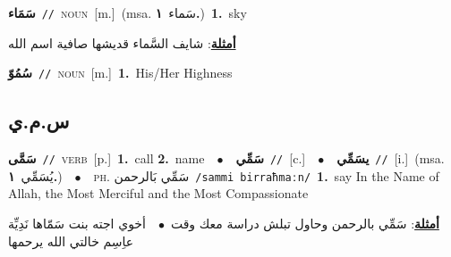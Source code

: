 \documentclass[10pt,a4paper,twoside]{article} %
\begin{document}
\begin{multicols}{2}
{\setlength\topsep{0pt}\textbf{\foreignlanguage{arabic}{سَمَاء}}\ {\color{gray}\texttt{//}\color{black}}\ \textsc{noun}\ [m.]\ \color{gray}(msa. \foreignlanguage{arabic}{سَماء}~\foreignlanguage{arabic}{\textbf{١.}})\color{black}\ \textbf{1.}~sky\  \begin{flushright}\color{gray}\foreignlanguage{arabic}{\textbf{\underline{\foreignlanguage{arabic}{أمثلة}}}: شايف السَّماء قديشها صافية اسم الله}\end{flushright}\color{black}} \vspace{2mm}

{\setlength\topsep{0pt}\textbf{\foreignlanguage{arabic}{سُمُوّ}}\ {\color{gray}\texttt{//}\color{black}}\ \textsc{noun}\ [m.]\ \textbf{1.}~His/Her Highness\ } \vspace{2mm}

\vspace{-3mm}
\subsection*{\color{blue}\foreignlanguage{arabic}{س.م.ي}\color{blue}{}} 

{\setlength\topsep{0pt}\textbf{\foreignlanguage{arabic}{سَمَّى}}\ {\color{gray}\texttt{//}\color{black}}\ \textsc{verb}\ [p.]\ \textbf{1.}~call  \textbf{2.}~name\ \ $\bullet$\ \ \setlength\topsep{0pt}\textbf{\foreignlanguage{arabic}{سَمِّي}}\ {\color{gray}\texttt{//}\color{black}}\ [c.]\ \ $\bullet$\ \ \setlength\topsep{0pt}\textbf{\foreignlanguage{arabic}{يسَمِّي}}\ {\color{gray}\texttt{//}\color{black}}\ [i.]\ \color{gray}(msa. \foreignlanguage{arabic}{يُسَمِّي}~\foreignlanguage{arabic}{\textbf{١.}})\color{black}\ \ $\bullet$\ \ \textsc{ph.} \color{gray} \foreignlanguage{arabic}{سَمِّي بَالرحمن}\color{black}\ {\color{gray}\texttt{/{\sffamily sammi birraħmaːn}/}\color{black}}\ \textbf{1.}~say In the Name of Allah, the Most Merciful and the Most Compassionate\  \begin{flushright}\color{gray}\foreignlanguage{arabic}{\textbf{\underline{\foreignlanguage{arabic}{أمثلة}}}: سَمِّي بالرحمن وحاول تبلش دراسة معك وقت\ $\bullet$\ \  أخوي اجته بنت سَمّاها نَدِيِّة عاِسِم خالتي الله يرحمها}\end{flushright}\color{black}} \vspace{2mm}


\end{multicols}
\end{document}
